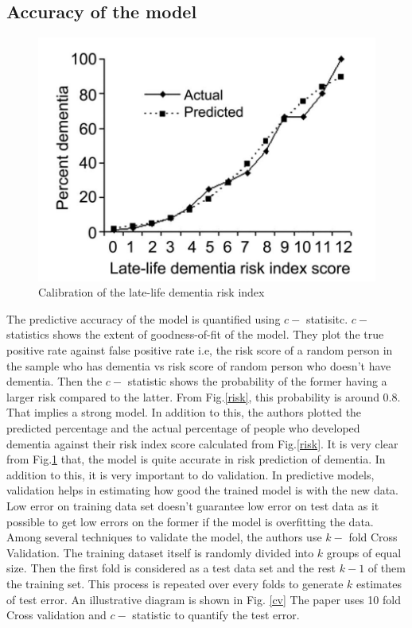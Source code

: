 \documentclass[12pt,letterpaper]{article}
\begin{document}
\subsection{Accuracy of the model}

\begin{figure}
\vspace{-11 mm}
\includegraphics[width=7 cm]{riskplot.png}
\caption{Calibration of the late-life dementia risk index}
\label{plotrisk}
\end{figure}

The predictive accuracy of the model is quantified using $c-$ statisitc. $c-$ statistics shows the extent of goodness-of-fit of the model. They plot the true positive rate against false positive rate i.e, the risk score of a random person in the sample who has dementia vs risk score of random person who doesn't have dementia. Then the $c-$ statistic shows the probability of the former having a larger risk compared to the latter. From Fig.\ref{risk}, this probability is around 0.8. That implies a strong model.  In addition to this, the authors plotted the predicted percentage and the actual percentage of people who developed dementia against their risk index score calculated from Fig.\ref{risk}. It is very clear from Fig.\ref{plotrisk} that, the model is quite accurate in risk prediction of dementia.  In addition to this, it is very important to do validation. In  predictive models, validation helps in estimating how good the trained model is with the new data. Low error on training data set doesn't guarantee low error on test data as it possible to get low errors on the former if the model is overfitting the data. Among several techniques to validate the model, the authors use $k-$ fold Cross Validation. The training dataset itself is randomly divided into $k$ groups of equal size. Then the first fold is considered as a test data set and the rest $k-1$ of them the training set. This process is repeated over every folds to generate $k$ estimates of test error. An illustrative diagram is shown in Fig. \ref{cv} The paper uses 10 fold Cross validation and $c-$ statistic to quantify the test error.
\end{document}
